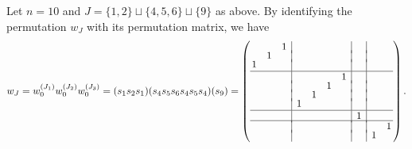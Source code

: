 \begin{exam}\label{eg: wJ}
{\rm
Let $n=10$ and $J=\{1,2\} \sqcup\{4,5,6\} \sqcup\{9\}$ as above. By identifying the permutation $w_J$ with its permutation matrix, we have 
\begin{align*}
 w_J 
 = w_0^{(J_1)} w_0^{(J_2)} w_0^{(J_3)} 
 = (s_1s_2s_1) (s_4s_5s_6s_4s_5s_4) (s_9)
 =
 \left(
 \begin{array}{@{\,}ccc|cccc|c|cc@{\,}}\vspace{-3pt}
     & & 1 & & & & & & & \\ 
     & 1 & & & & & & & & \vspace{-3pt}\\ 
    1 & & & & & & & & & \\ \hline
     & & & & & & 1& & &  \vspace{-3pt}\\
     & & & & & 1 & & & & \vspace{-3pt}\\
     & & & & 1 & & & & & \vspace{-3pt}\\
     & & & 1 & & & & & & \\ \hline 
     & & & & & & & 1 & & \vspace{-2pt}\\ \hline
     & & & & & & & & & 1 \vspace{-3pt}\\
     & & & & & & & & 1 & 
 \end{array}
 \right).
\end{align*}}
\end{exam}

